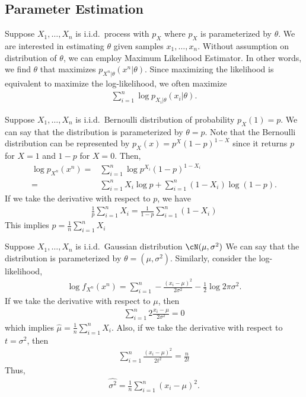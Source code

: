 \documentclass{article}
\begin{document}
\subsection{Parameter Estimation}
Suppose $X_1, \dots, X_n$ is i.i.d.~process with $p_X$ where $p_X$ is parameterized by $\theta$.
We are interested in estimating $\theta$ given samples $x_1, \dots, x_n$.
Without assumption on distribution of $\theta$, we can employ Maximum Likelihood Estimator.
In other words, we find $\theta$ that maximizes $p_{X^n|\theta}(x^n|\theta)$.
Since maximizing the likelihood is equivalent to maximize the log-likelihood, we often maximize
\begin{align}
    \sum_{i=1}^n \log p_{X_i|\theta} (x_i|\theta).
\end{align}

\begin{example}
    Suppose $X_1, \dots, X_n$ is i.i.d.~Bernoulli distribution of probability $p_X(1) = p$.
    We can say that the distribution is parameterized by $\theta=p$.
    Note that the Bernoulli distribution can be represented by $p_{X}(x) = p^X(1-p)^{1-X}$ since it returns $p$ for $X=1$ and $1-p$ for $X=0$.
    Then,
    \begin{align}
        \log p_{X^n}(x^n) =& \sum_{i=1}^n \log p^{X_i}(1-p)^{1-X_i}\\
        =& \sum_{i=1}^n X_i \log p + \sum_{i=1}^n (1-X_i)\log (1-p).
    \end{align}
    If we take the derivative with respect to $p$, we have
    \begin{align}
        \frac{1}{p}\sum_{i=1}^n X_i  = \frac{1}{1-p} \sum_{i=1}^n (1-X_i)
    \end{align}
    This implies $\hat{p} = \frac{1}{n}\sum_{i=1}^n X_i$
\end{example}

\begin{example}
    Suppose $X_1, \dots, X_n$ is i.i.d.~Gaussian distribution $\cN(\mu, \sigma^2)$
    We can say that the distribution is parameterized by $\theta=(\mu, \sigma^2)$.
    Similarly, consider the log-likelihood,
    \begin{align}
        \log f_{X^n}(x^n) = \sum_{i=1}^n -\frac{(x_i-\mu)^2}{2\sigma^2} - \frac{1}{2}\log 2\pi \sigma^2.
    \end{align}
    If we take the derivative with respect to $\mu$, then 
    \begin{align}
         \sum_{i=1}^n 2\frac{x_i-\mu}{2\sigma^2} = 0
    \end{align}
    which implies $\hat{\mu} = \frac{1}{n}\sum_{i=1}^{n}X_i$.
    Also, if we take the derivative with respect to $t = \sigma^2$, then
    \begin{align}
         \sum_{i=1}^n \frac{(x_i-\mu)^2}{2t^2} = \frac{n}{2t}
    \end{align}
    Thus,
    \begin{align}
        \widehat{\sigma^2} = \frac{1}{n}\sum_{i=1}^n (x_i-\mu)^2.
    \end{align}
\end{example}
\end{document}
